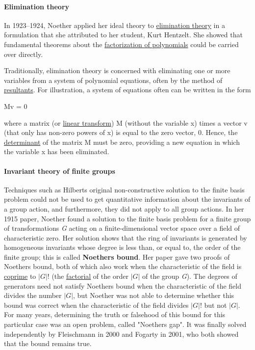 \paragraph{Elimination theory}\label{Elimination_theory}

In 1923--1924, Noether applied her ideal theory to \href{https://en.wikipedia.org/wiki/Elimination_theory}{elimination theory} in a formulation that she attributed to her student, Kurt Hentzelt. She showed that fundamental theorems about the \href{https://en.wikipedia.org/wiki/Factorization_of_polynomials}{factorization of polynomials} could be carried over directly.

Traditionally, elimination theory is concerned with eliminating one or more variables from a system of polynomial equations, often by the method of \href{https://en.wikipedia.org/wiki/Resultant}{resultants}.
For illustration, a system of equations often can be written in the form

{Mv = 0}

where a matrix (or \href{https://en.wikipedia.org/wiki/Linear_transform}{linear transform}) {M} (without the variable {x}) times a vector {v} (that only has non-zero powers of {x}) is equal to the zero vector, {0}. Hence, the \href{https://en.wikipedia.org/wiki/Determinant}{determinant} of the matrix {M} must be zero, providing a new equation in which the variable {x} has been eliminated.


\paragraph{Invariant theory of finite groups}\label{Invariant_theory_of_finite_groups}

Techniques such as Hilbert\textquotesingle s original non-constructive solution to the finite basis problem could not be used to get quantitative information about the invariants of a group action, and furthermore, they did not apply to all group actions. In her 1915 paper, Noether found a solution to the finite basis problem for a finite group of transformations {\emph{G}} acting on a finite-dimensional vector space over a field of characteristic zero. Her solution shows that the ring of invariants is generated by homogeneous invariants whose degree is less than, or equal to, the order of the finite group; this is called \textbf{Noether\textquotesingle s bound}. Her paper gave two proofs of Noether\textquotesingle s bound, both of which also work when the characteristic of the field is \href{https://en.wikipedia.org/wiki/Coprime}{coprime} to {{\(|G|!\)}{}} (the \href{https://en.wikipedia.org/wiki/Factorial}{factorial} of the order {{\(|G|\)}{}} of the group {\emph{G}}). The degrees of generators need not satisfy Noether\textquotesingle s bound when the characteristic of the field divides the number {{\(|G|\)}{}}, but Noether was not able to determine whether this bound was correct when the characteristic of the field divides {{\(|G|!\)}{}} but not {{\(|G|\)}{}}. For many years, determining the truth or falsehood of this bound for this particular case was an open problem, called "Noether\textquotesingle s gap". It was finally solved independently by Fleischmann in 2000 and Fogarty in 2001, who both showed that the bound remains true.

